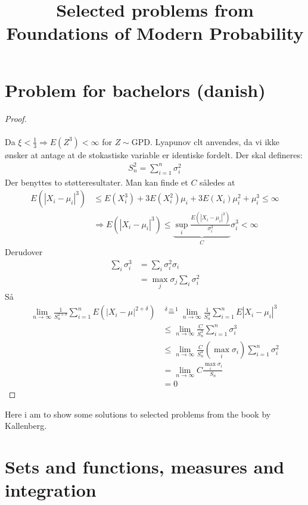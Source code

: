 \documentclass[11pt]{article}
\begin{document}
\section*{Problem for bachelors (danish)}
\begin{proof}
	\\ \\
Da $\xi < \frac{1}{3} \Rightarrow E(Z^3)< \infty$ for $Z \sim \text{GPD}$. 
Lyapunov clt anvendes, da vi ikke ønsker at antage at de stokastiske variable er identiske fordelt. Der skal defineres:
	\begin{align*}
		S_n^2 = \sum_{i=1}^n \sigma_i^2
	\end{align*}
Der benyttes to støtteresultater.
Man kan finde et $C$ således at 
	\begin{align*}
		E(|X_i - \mu_i|^3) &\leq E(X_i^3) + 3 E(X_i^2) \mu_i + 3 E(X_i) \mu_i^2 + \mu_i^3 \leq \infty\\
		&\Rightarrow E(|X_i -\mu_i|^3) \leq \underbrace{\sup_i \frac{E(|X_i - \mu_i|^3)}{\sigma_i^3}}_{C}\sigma_i^3 < \infty
	\end{align*}
Derudover 
	\begin{align*}
		\sum_i \sigma_i^3 &= \sum_i \sigma_i^2 \sigma_i \\
		&= \max_j \sigma_j \sum_i \sigma_i^2
	\end{align*}
Så
	\begin{align*}
		\lim_{n \rightarrow \infty} \frac{1}{S_n^{2 + \delta}}\sum_{i=1}^n E\left(\left|X_i - \mu \right|^{2+\delta} \right) &\overset{\delta =1}{=}\lim_{n\rightarrow \infty} \frac{1}{S_n^{3}}\sum_{i=1}^n E|X_i - \mu_i|^3 \\
		&\leq \lim_{n\rightarrow \infty}\frac{C}{S_n^3}\sum_{i=1}^n  \sigma^3_i \\
		&\leq  \lim_{n\rightarrow \infty}\frac{C}{S_n^3}(\max_i \sigma_i ) \sum_{i=1}^n \sigma_i^2\\
		&=\lim_{n\rightarrow \infty}C \frac{\max_i \sigma_i}{S_n} \\
		&= 0
	\end{align*}


\end{proof}

\newpage
\title{Selected problems from Foundations of Modern Probability}
Here i am to show some solutions to selected problems from the book by Kallenberg.

\section{Sets and functions, measures and integration}
\end{document}
